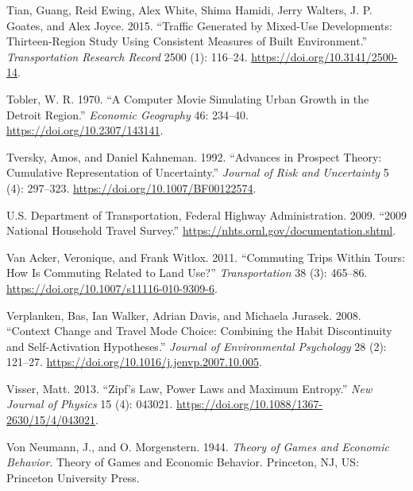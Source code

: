 \documentclass[
  12pt,
]{article}
\newlength{\cslhangindent}
\newlength{\cslentryspacingunit} %
\newenvironment{CSLReferences}[2] %
 {%
  \setlength{\parindent}{0pt}
  \ifodd #1
  \let\oldpar\par
  \def\par{\hangindent=\cslhangindent\oldpar}
  \fi
  \setlength{\parskip}{#2\cslentryspacingunit}
 }%
 {}
\begin{document}
\begin{CSLReferences}{1}{0}
\leavevmode{}%
Tian, Guang, Reid Ewing, Alex White, Shima Hamidi, Jerry Walters, J. P. Goates, and Alex Joyce. 2015. {``Traffic {Generated} by {Mixed-Use Developments}: {Thirteen-Region Study Using Consistent Measures} of {Built Environment}.''} \emph{Transportation Research Record} 2500 (1): 116--24. \url{https://doi.org/10.3141/2500-14}.

\leavevmode{}%
Tobler, W. R. 1970. {``A {Computer Movie Simulating Urban Growth} in the {Detroit Region}.''} \emph{Economic Geography} 46: 234--40. \url{https://doi.org/10.2307/143141}.

\leavevmode{}%
Tversky, Amos, and Daniel Kahneman. 1992. {``Advances in Prospect Theory: {Cumulative} Representation of Uncertainty.''} \emph{Journal of Risk and Uncertainty} 5 (4): 297--323. \url{https://doi.org/10.1007/BF00122574}.

\leavevmode{}%
U.S. Department of Transportation, Federal Highway Administration. 2009. {``2009 {National Household Travel Survey}.''} \url{https://nhts.ornl.gov/documentation.shtml}.

\leavevmode{}%
Van Acker, Veronique, and Frank Witlox. 2011. {``Commuting Trips Within Tours: How Is Commuting Related to Land Use?''} \emph{Transportation} 38 (3): 465--86. \url{https://doi.org/10.1007/s11116-010-9309-6}.

\leavevmode{}%
Verplanken, Bas, Ian Walker, Adrian Davis, and Michaela Jurasek. 2008. {``Context Change and Travel Mode Choice: {Combining} the Habit Discontinuity and Self-Activation Hypotheses.''} \emph{Journal of Environmental Psychology} 28 (2): 121--27. \url{https://doi.org/10.1016/j.jenvp.2007.10.005}.

\leavevmode{}%
Visser, Matt. 2013. {``Zipf's Law, Power Laws and Maximum Entropy.''} \emph{New Journal of Physics} 15 (4): 043021. \url{https://doi.org/10.1088/1367-2630/15/4/043021}.

\leavevmode{}%
Von Neumann, J., and O. Morgenstern. 1944. \emph{Theory of Games and Economic Behavior}. Theory of Games and Economic Behavior. {Princeton, NJ, US}: {Princeton University Press}.


\end{CSLReferences}
\end{document}
